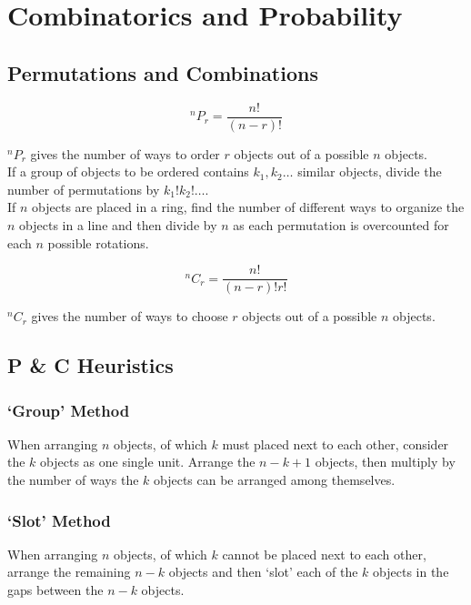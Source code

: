 \documentclass[../main]{subfiles}
\begin{document}
\section{Combinatorics and Probability}

	\subsection{Permutations and Combinations}

	\[ ^nP_r = \frac{n!}{(n-r)!} \]

	\(^nP_r\) gives the number of ways to order \(r\) objects out of a possible \(n\) objects. \\

	If a group of objects to be ordered contains \(k_1, k_2 \dots \) similar objects, divide the number of permutations by \(k_1! k_2! \dots\). \\

	If \(n\) objects are placed in a ring, find the number of different ways to organize the \(n\) objects in a line and then divide by \(n\) as each permutation is overcounted for each \(n\) possible rotations. 

	\[ ^nC_r = \frac{n!}{(n-r)! r!} \]

	\(^nC_r\) gives the number of ways to choose \(r\) objects out of a possible \(n\) objects. \\

	\subsection{P \& C Heuristics}

	\subsubsection{`Group' Method}

	When arranging \(n\) objects, of which \(k\) must placed next to each other, consider the \(k\) objects as one single unit. Arrange the \(n-k+1\) objects, then multiply by the number of ways the \(k\) objects can be arranged among themselves. \\

	\subsubsection{`Slot' Method}

	When arranging \(n\) objects, of which \(k\) cannot be placed next to each other, arrange the remaining \(n-k\) objects and then `slot' each of the \(k\) objects in the gaps between the \(n-k\) objects. \\
\end{document}
